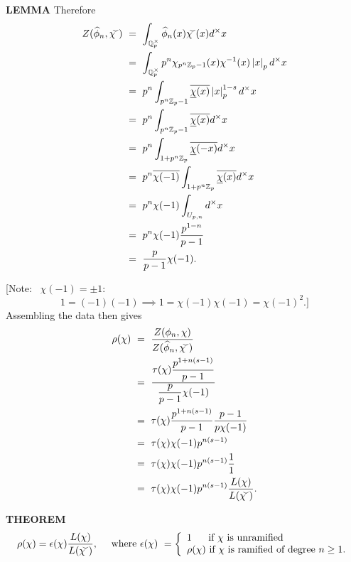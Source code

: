 \begin{x}{\small\bf LEMMA}
Therefore 
\begin{align*}
Z(\widehat{\phi}_n, \widecheck{\chi}) \ 
&=\  \int_{\Q_p^\times} \widehat{\phi}_n(x) \widecheck{\chi}(x) d^\times x \\		
&=\  \int_{\Q_p^\times} p^n \chi_{p^n \Z_p-1} (x)  \chi^{-1}(x) \abs{x}_p d^\times x \\	
&=\  p^n\int_{p^n\Z_p-1} \ov{\un{\chi}(x)} \abs{x}_p^{1-s}d^\times x \\	
&=\  p^n\int_{p^n\Z_p-1} \ov{\un{\chi}(x)} d^\times x \\
&=\  p^n\int_{1 + p^n\Z_{p}} \ov{\un{\chi}(-x)} d^\times x \\	
&=\  p^n \ov{\chi(-1)} \int_{1 + p^n\Z_{p}} \ov{\un{\chi}(x)} d^\times x \\
&=\  p^n \chi(-1) \int_{U_{p,n}} d^\times x \\	
&=\  p^n \chi(-1) \frac{p^{1-n}}{p-1} \\
&=\  \frac{p}{p-1} \chi(-1).
\end{align*}

\vspace{0.1cm}

[Note: \ $\chi(-1) = \pm 1:$
\[
1 = (-1)(-1) \implies 1 = \chi(-1)\chi(-1) = \chi(-1)^2.]
\]
Assembling the data then gives
\begin{align*}
\rho(\chi) \ 
&=\  \frac{Z(\phi_n, \chi)}{Z(\widehat{\phi}_n, \widecheck{\chi})} \\		
&=\  \frac{\tau(\chi) \ds\frac{p^{1 + n(s-1)}}{p-1} }    {\ds\frac{p}{p-1}\chi(-1)}\\
&=\  \tau(\chi) \ds\frac{p^{1 + n(s-1)}}{p-1}  \frac{p-1}{p\chi(-1)}\\
&=\  \tau(\chi) \chi(-1) p^{n(s-1)}\\
&=\  \tau(\chi) \chi(-1) p^{n(s-1)} \ds\frac{1}{1}\\
&=\  \tau(\chi) \chi(-1) p^{n(s-1)} \ds\frac{L(\chi)}{L(\widecheck{\chi})}.
\end{align*}
\end{x}

\vspace{0.1cm}

\begin{x}{\small\bf THEOREM} \ %
\[\rho(\chi) = \epsilon(\chi) \frac{L(\chi)}{L(\widecheck{\chi})}, \quad \text{ where } \epsilon(\chi)  \ =\left\{
\begin{array}{l l}
1 \quad \text{ }  \text{ if $\chi$ is unramified}\\
\rho(\chi)  \text{ if $\chi$ is ramified of degree $n \ge 1$.}\\
\end{array}
\right.\]
\end{x}

